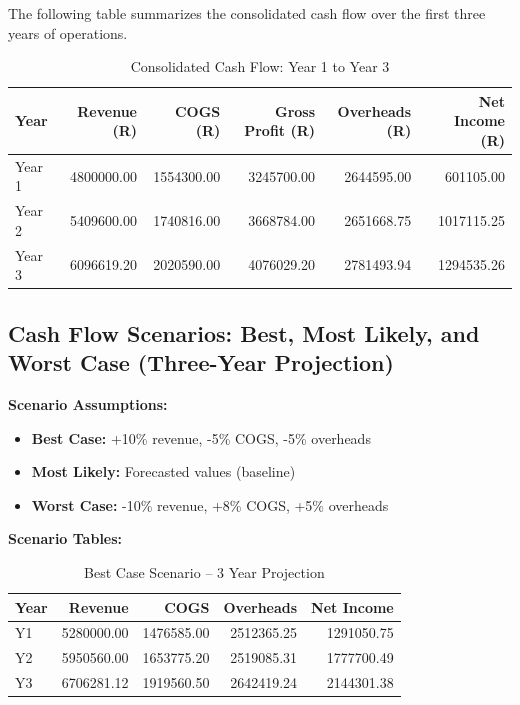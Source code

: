 \vspace{0.5em}
\noindent The following table summarizes the consolidated cash flow over the first three years of operations.

\begin{table}[H]
\centering
\caption{Consolidated Cash Flow: Year 1 to Year 3}
\begin{tabular}{|l|r|r|r|r|r|}
\hline
\textbf{Year} & \textbf{Revenue (R)} & \textbf{COGS (R)} & \textbf{Gross Profit (R)} & \textbf{Overheads (R)} & \textbf{Net Income (R)} \\
\hline
Year 1 & 4800000.00 & 1554300.00 & 3245700.00 & 2644595.00 & 601105.00 \\
\hline
Year 2 & 5409600.00 & 1740816.00 & 3668784.00 & 2651668.75 & 1017115.25 \\
\hline
Year 3 & 6096619.20 & 2020590.00 & 4076029.20 & 2781493.94 & 1294535.26 \\
\hline
\end{tabular}
\end{table}

\subsection*{Cash Flow Scenarios: Best, Most Likely, and Worst Case (Three-Year Projection)}

\textbf{Scenario Assumptions:}
\begin{itemize}
  \item \textbf{Best Case:} +10\% revenue, -5\% COGS, -5\% overheads
  \item \textbf{Most Likely:} Forecasted values (baseline)
  \item \textbf{Worst Case:} -10\% revenue, +8\% COGS, +5\% overheads
\end{itemize}

\textbf{Scenario Tables:}

\begin{table}[H]
\centering
\caption{Best Case Scenario – 3 Year Projection}
\begin{tabular}{|l|r|r|r|r|}
\hline
\textbf{Year} & \textbf{Revenue} & \textbf{COGS} & \textbf{Overheads} & \textbf{Net Income} \\
\hline
Y1 & 5280000.00 & 1476585.00 & 2512365.25 & 1291050.75 \\
\hline
Y2 & 5950560.00 & 1653775.20 & 2519085.31 & 1777700.49 \\
\hline
Y3 & 6706281.12 & 1919560.50 & 2642419.24 & 2144301.38 \\
\hline
\end{tabular}
\end{table}

